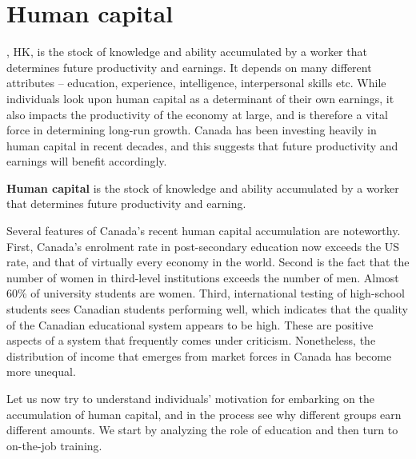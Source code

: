 \section{Human capital}\label{sec:ch13sec1}

, HK, is the stock of knowledge and ability
accumulated by a worker that determines future productivity and earnings. It
depends on many different attributes -- education, experience, intelligence,
interpersonal skills etc. While individuals look upon human capital as a
determinant of their own earnings, it also impacts the productivity of the
economy at large, and is therefore a vital force in determining long-run
growth. Canada has been investing heavily in human
capital in recent decades, and this suggests that future productivity and
earnings will benefit accordingly.

\begin{DefBox}
	\textbf{Human capital} is the stock of knowledge and ability accumulated by a worker that determines future productivity and earning.
\end{DefBox}

Several features of Canada's recent human capital accumulation are
noteworthy. First, Canada's enrolment rate in post-secondary education now
exceeds the US rate, and that of virtually every economy in the world.
Second is the fact that the number of women in third-level institutions
exceeds the number of men. Almost 60\% of university students are women.
Third, international testing of high-school students sees Canadian students
performing well, which indicates that the quality of the Canadian
educational system appears to be high. These are positive aspects of a
system that frequently comes under criticism. Nonetheless, the distribution
of income that emerges from market forces in Canada has become more unequal.

Let us now try to understand individuals' motivation for embarking on the
accumulation of human capital, and in the process see why different groups
earn different amounts. We start by analyzing the role of education and then
turn to on-the-job training.
